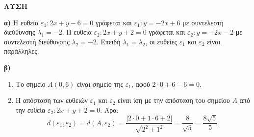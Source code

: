 \textbf{ΛΥΣΗ}

\textbf{α)} Η ευθεία $\varepsilon_1: 2x+y-6=0$ γράφεται και $\varepsilon_1: y=-2x+6$ με συντελεστή διεύθυνσης $\lambda_1 = -2$.
Η ευθεία $\varepsilon_2: 2x+y+2=0$ γράφεται και $\varepsilon_2: y=-2x-2$ με συντελεστή διεύθυνσης $\lambda_2 = -2$.
Επειδή $\lambda_1 = \lambda_2$, οι ευθείες $\varepsilon_1$ και $\varepsilon_2$ είναι παράλληλες.

\textbf{β)}
\begin{enumerate}
    \item[i.] Το σημείο $A(0,6)$ είναι σημείο της $\varepsilon_1$, αφού $2 \cdot 0 + 6 - 6 = 0$.
    \item[ii.] Η απόσταση των ευθειών $\varepsilon_1$ και $\varepsilon_2$ είναι ίση με την απόσταση του σημείου $A$ από την ευθεία $\varepsilon_2: 2x+y+2=0$. Άρα:
    \[
    d(\varepsilon_1, \varepsilon_2) = d(A, \varepsilon_2) = \frac{|2 \cdot 0 + 1 \cdot 6 + 2|}{\sqrt{2^2+1^2}} = \frac{8}{\sqrt{5}} = \frac{8\sqrt{5}}{5}.
    \]
\end{enumerate}